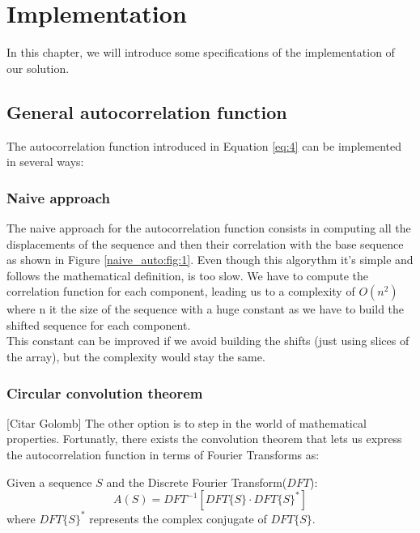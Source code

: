 \chapter{Implementation}
  In this chapter, we will introduce some specifications of the implementation
  of our solution.\\


  \section{General autocorrelation function}
    The autocorrelation function introduced in Equation \ref{eq:4} can be
    implemented in several ways:

      \subsection{Naive approach}
        The naive approach for the autocorrelation function consists in
        computing all the displacements of the sequence and then
        their correlation with the base sequence as shown in Figure
        \ref{naive_auto:fig:1}. Even though this algorythm it's simple and
        follows the mathematical definition, is too slow. We have to compute
        the correlation function for each component, leading us to a
        complexity of $O(n^{2})$ where n it the size of the sequence with a
        huge constant as we have to build the shifted sequence for each
        component.\\

        This constant can be improved if we avoid building the shifts (just
        using slices of the array), but the complexity would stay the same.

      \subsection{Circular convolution theorem}
        [Citar Golomb]
        The other option is to step in the world of mathematical properties.
        Fortunatly, there exists the convolution theorem that lets us express
        the autocorrelation function in terms of Fourier Transforms as:
        \begin{theorem}
          Given a sequence $S$ and the Discrete Fourier Transform($DFT$):
          \begin{equation}
            A(S) = DFT^{-1}[DFT\{S\} · DFT\{S\}^{*}]
          \end{equation}
          where $DFT\{S\}^{*}$ represents the complex conjugate of $DFT\{S\}$.
        \end{theorem}

